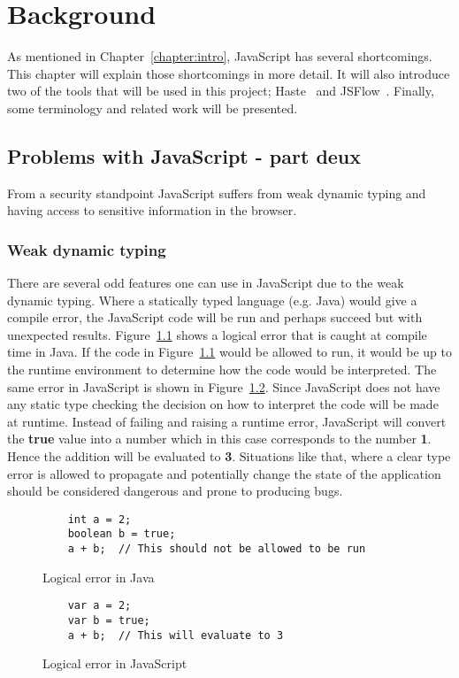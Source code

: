 \chapter{Background}
As mentioned in Chapter~\ref{chapter:intro}, JavaScript has several shortcomings. This chapter will explain those shortcomings in more detail. It will also introduce two of the tools that will be used in this project; Haste~\cite{haste-lang} and JSFlow~\cite{jsflow,jsflow-csf12,jsflow-sac14}. Finally, some terminology and related work will be presented.

\section{Problems with JavaScript - part deux}
From a security standpoint JavaScript suffers from weak dynamic typing and having access to sensitive information in the browser.
\subsection{Weak dynamic typing}
\label{chapter:weak-dynamic-typing}
There are several odd features one can use in JavaScript due to the weak dynamic typing. Where a statically typed language (e.g. Java) would give a compile error, the JavaScript code will be run and perhaps succeed but with unexpected results. Figure~\ref{fig:error_java} shows a logical error that is caught at compile time in Java. If the code in Figure~\ref{fig:error_java} would be allowed to run, it would be up to the runtime environment to determine how the code would be interpreted. The same error in JavaScript is shown in Figure~\ref{fig:error_js}. Since JavaScript does not have any static type checking the decision on how to interpret the code will be made at runtime. Instead of failing and raising a runtime error, JavaScript will convert the \textbf{true} value into a number which in this case corresponds to the number \textbf{1}. Hence the addition will be evaluated to \textbf{3}. Situations like that, where a clear type error is allowed to propagate and potentially change the state of the application should be considered dangerous and prone to producing bugs.
\begin{figure}[h]
  \begin{verbatim}
    int a = 2;
    boolean b = true;
    a + b;  // This should not be allowed to be run
  \end{verbatim}
  \caption{Logical error in Java}
  \label{fig:error_java}
\end{figure}
\begin{figure}[h]
  \begin{verbatim}
    var a = 2;
    var b = true;
    a + b;  // This will evaluate to 3
  \end{verbatim}
  \caption{Logical error in JavaScript}
  \label{fig:error_js}
\end{figure}


